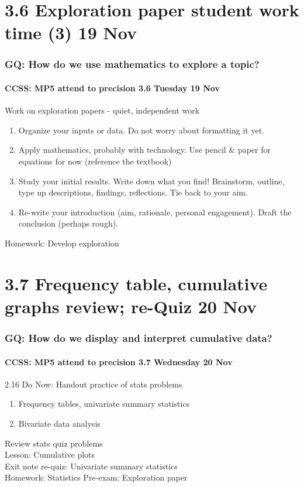 \documentclass{beamer}
\begin{document}
\section{3.6 Exploration paper student work time (3) 19 Nov}
\frame
{
  \frametitle{GQ: How do we use mathematics to explore a topic?}
  \framesubtitle{CCSS: MP5 attend to precision \hfill \alert{3.6 Tuesday 19 Nov}}

  \begin{block}{Work on exploration papers - quiet, independent work}
  \begin{enumerate}
      \item Organize your inputs or data. Do not worry about formatting it yet. 
      \item Apply mathematics, probably with technology. Use pencil \& paper for equations for now (reference the textbook)
      \item Study your initial results. Write down what you find! Brainstorm, outline, type up descriptions, findings, reflections. Tie back to your aim.
      \item Re-write your introduction (aim, rationale, personal engagement). Draft the conclusion (perhaps rough). 
  \end{enumerate}
  \end{block}
  Homework: Develop exploration 
}

\section{3.7 Frequency table, cumulative graphs review; re-Quiz 20 Nov}
\frame
{
  \frametitle{GQ: How do we display and interpret cumulative data?}
  \framesubtitle{CCSS: MP5 attend to precision \hfill \alert{3.7 Wednesday 20 Nov}}

  \begin{block}{2.16 Do Now: Handout practice of stats problems}
  \begin{enumerate}
      \item Frequency tables, univariate summary statistics
      \item Bivariate data analysis
  \end{enumerate}
  \end{block}
  Review stats quiz problems \\
  Lesson: Cumulative plots \\ \smallskip
  Exit note re-quiz: Univariate summary statistics \\ \smallskip
  Homework: Statistics Pre-exam; Exploration paper
}
\end{document}
